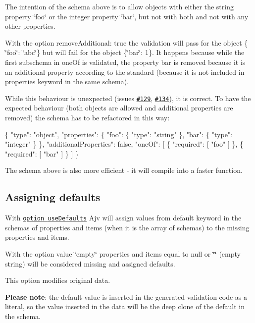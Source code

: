 The intention of the schema above is to allow objects with either the string property \char`\"{}foo\char`\"{} or the integer property \char`\"{}bar\char`\"{}, but not with both and not with any other properties.

With the option {\ttfamily remove\+Additional\+: true} the validation will pass for the object {\ttfamily \{ \char`\"{}foo\char`\"{}\+: \char`\"{}abc\char`\"{}\}} but will fail for the object {\ttfamily \{\char`\"{}bar\char`\"{}\+: 1\}}. It happens because while the first subschema in {\ttfamily one\+Of} is validated, the property {\ttfamily bar} is removed because it is an additional property according to the standard (because it is not included in {\ttfamily properties} keyword in the same schema).

While this behaviour is unexpected (issues \href{https://github.com/epoberezkin/ajv/issues/129}{\tt \#129}, \href{https://github.com/epoberezkin/ajv/issues/134}{\tt \#134}), it is correct. To have the expected behaviour (both objects are allowed and additional properties are removed) the schema has to be refactored in this way\+:


\begin{DoxyCode}
\{
  "type": "object",
  "properties": \{
    "foo": \{ "type": "string" \},
    "bar": \{ "type": "integer" \}
  \},
  "additionalProperties": false,
  "oneOf": [
    \{ "required": [ "foo" ] \},
    \{ "required": [ "bar" ] \}
  ]
\}
\end{DoxyCode}


The schema above is also more efficient -\/ it will compile into a faster function.

\subsection*{Assigning defaults}

With \href{#options}{\tt option {\ttfamily use\+Defaults}} Ajv will assign values from {\ttfamily default} keyword in the schemas of {\ttfamily properties} and {\ttfamily items} (when it is the array of schemas) to the missing properties and items.

With the option value {\ttfamily \char`\"{}empty\char`\"{}} properties and items equal to {\ttfamily null} or {\ttfamily \char`\"{}\char`\"{}} (empty string) will be considered missing and assigned defaults.

This option modifies original data.

{\bfseries Please note}\+: the default value is inserted in the generated validation code as a literal, so the value inserted in the data will be the deep clone of the default in the schema.

